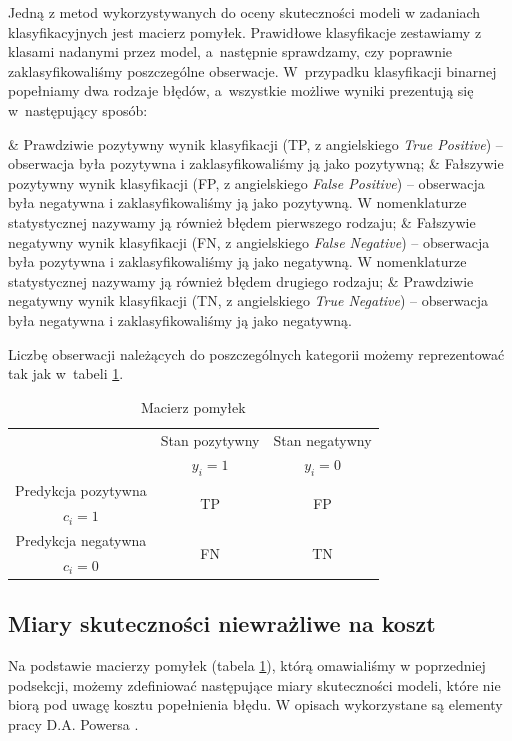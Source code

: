 \documentclass[inzynierska]{pwr_wmat_praca_dyplomowa}
\theoremstyle{plain}
\numberwithin{theorem}{chapter}
\theoremstyle{definition}
\numberwithin{theorem}{chapter}
\begin{document}
Jedną z metod wykorzystywanych do oceny skuteczności modeli w zadaniach klasyfikacyjnych jest macierz pomyłek. Prawidłowe klasyfikacje zestawiamy z klasami nadanymi przez model, a~następnie sprawdzamy, czy poprawnie zaklasyfikowaliśmy poszczególne obserwacje. W~przypadku klasyfikacji binarnej popełniamy dwa rodzaje błędów, a~wszystkie możliwe wyniki prezentują się w~następujący sposób:
\begin{myitemize}
	& Prawdziwie pozytywny wynik klasyfikacji (TP, z angielskiego \textit{True Positive}) -- obserwacja była pozytywna i zaklasyfikowaliśmy ją jako pozytywną;
	& Fałszywie pozytywny wynik klasyfikacji (FP, z angielskiego \textit{False Positive}) -- obserwacja była negatywna i zaklasyfikowaliśmy ją jako pozytywną. W nomenklaturze statystycznej nazywamy ją również błędem pierwszego rodzaju;
	& Fałszywie negatywny wynik klasyfikacji (FN, z angielskiego \textit{False Negative}) -- obserwacja była pozytywna i zaklasyfikowaliśmy ją jako negatywną. W nomenklaturze statystycznej nazywamy ją również błędem drugiego rodzaju;
	& Prawdziwie negatywny wynik klasyfikacji (TN, z angielskiego \textit{True Negative}) -- obserwacja była negatywna i zaklasyfikowaliśmy ją jako negatywną.
\end{myitemize}
\noindent Liczbę obserwacji należących do poszczególnych kategorii możemy reprezentować tak jak w~tabeli \ref{tab:macierz-pomylek}.
\begin{table}[h]
	\begin{center}
		\begin{tabular}{c|c|c}
			 \multirow{2}{4em}{} & Stan pozytywny & Stan negatywny \\
			                  & $y_i = 1$            & $y_i = 0$ \\
			 \hline
			  Predykcja pozytywna & \multirow{2}{4em}{\centering TP} & \multirow{2}{4em}{\centering FP} \\
			    $c_i = 1$         &                    &                    \\
			 \hline
			 Predykcja negatywna & \multirow{2}{4em}{\centering FN} & \multirow{2}{4em}{\centering TN} \\
			   $c_i = 0$         &                    &                    \\
		\end{tabular}
	\end{center}
	\caption{Macierz pomyłek}
	\label{tab:macierz-pomylek}
\end{table}

\subsection{Miary skuteczności niewrażliwe na koszt}
Na podstawie macierzy pomyłek (tabela \ref{tab:macierz-pomylek}), którą omawialiśmy w poprzedniej podsekcji, możemy zdefiniować następujące miary skuteczności modeli, które nie biorą pod uwagę kosztu popełnienia błędu. W opisach wykorzystane są elementy pracy D.A. Powersa \cite{evaluation_metrics}.
\end{document}
